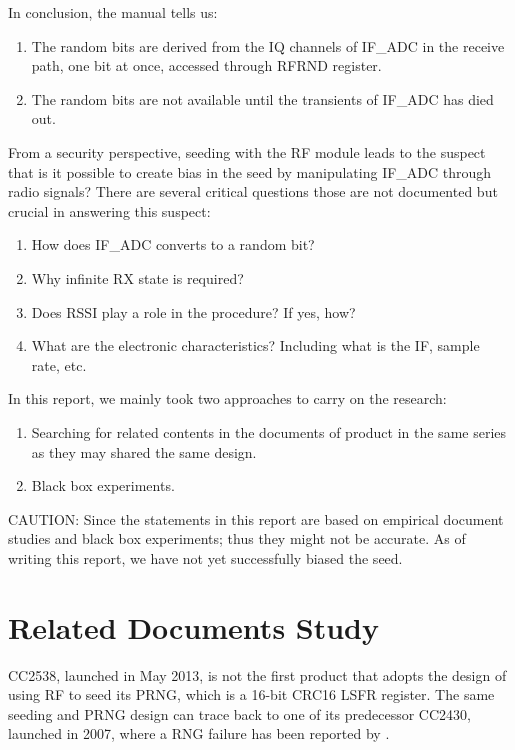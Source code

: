 In conclusion, the manual tells us:
\begin{enumerate}
\item The random bits are derived from the IQ channels of IF\_ADC in the receive path, one bit at once, accessed through RFRND register.
\item The random bits are not available until the transients of IF\_ADC has died out.
\end{enumerate}

From a security perspective, seeding with the RF module leads to the suspect that is it possible to create bias in the seed by manipulating IF\_ADC through radio signals? There are several critical questions those are not documented but crucial in answering this suspect:
\begin{enumerate}
\item How does IF\_ADC converts to a random bit?
\item Why infinite RX state is required?
\item Does RSSI play a role in the procedure? If yes, how?
\item What are the electronic characteristics? Including what is the IF, sample rate, etc.
\end{enumerate}

In this report, we mainly took two approaches to carry on the research:
\begin{enumerate}
\item Searching for related contents in the documents of product in the same series as they may shared the same design.
\item Black box experiments.
\end{enumerate}

CAUTION: Since the statements in this report are based on empirical document studies and black box experiments; thus they might not be accurate. As of writing this report, we have not yet successfully biased the seed.

\section{Related Documents Study}

CC2538, launched in May 2013, is not the first product that adopts the design of using RF to seed its PRNG, which is a 16-bit CRC16 LSFR register. The same seeding and PRNG design can trace back to one of its predecessor CC2430\cite{CC2430_Manual}, launched in 2007,  where a RNG failure has been reported by  \cite{CC2430Fail}.

